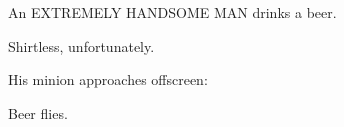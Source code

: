 \documentclass{bubbler}
\begin{document}
\begin{script}
\begin{comment}
\conv[][]{BRICK}{%
This is everybody we've ever put away.}

\conv[][starting the engine]{STEEL}{%
So much for retirement!}

They speed off.  To destiny!

\cut{CUT TO:}


\end{comment}


An EXTREMELY HANDSOME MAN drinks a beer.

\quad Shirtless, unfortunately.

His minion approaches offscreen:



Beer flies.



\end{script}
\end{document}
